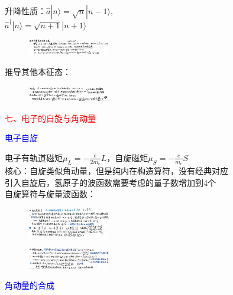 \documentclass[a4paper,8pt]{extarticle} %
\newcommand{\bluetext}[1]{\textcolor{blue}{#1}}
\newcommand{\redtext}[1]{\textcolor{red}{#1}}
\begin{document}
\begin{multicols}{3}
\begin{figure}[H]
\end{figure}
升降性质：$\hat{a}|n\rangle = \sqrt{n}|n-1\rangle, $\\
$ \hat{a}^\dagger|n\rangle = \sqrt{n+1}|n+1\rangle$\\
\begin{figure}[H]
    \vspace{-0.5cm}
    \centering
    \includegraphics[width=0.32\textwidth]{images/26.png}
    \vspace{-0.6cm}
\end{figure}
推导其他本征态：\\
\begin{figure}[H]
    \vspace{-0.5cm}
    \centering
    \includegraphics[width=0.32\textwidth]{images/27.png}
    \vspace{-0.6cm}
\end{figure}
\redtext{七、电子的自旋与角动量}

\bluetext{电子自旋}

电子有轨道磁矩$\mu_L = -\frac{e}{2m_e}L$，自旋磁矩$\mu_S = -\frac{e}{m_e}S$\\
核心：自旋类似角动量，但是纯内在构造算符，没有经典对应\\
引入自旋后，氢原子的波函数需要考虑的量子数增加到4个\\
自旋算符与旋量波函数：\\
\begin{figure}[H]
    \vspace{-0.5cm}
    \centering
    \includegraphics[width=0.32\textwidth]{images/10.png}
    \vspace{-0.6cm}
\end{figure}
\begin{figure}[H]
    \vspace{-0.5cm}
    \centering
    \includegraphics[width=0.32\textwidth]{images/11.png}
    \vspace{-0.6cm}
\end{figure}
\bluetext{角动量的合成}


\end{multicols}
\end{document}
